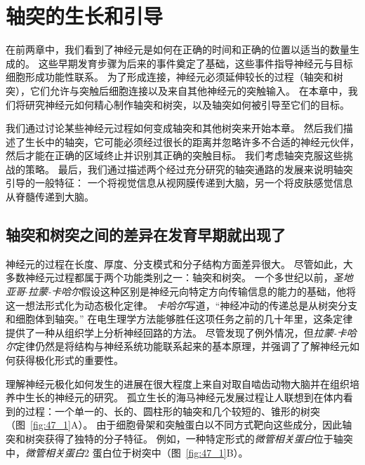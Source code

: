 \chapter{轴突的生长和引导} \label{chap:chap47}


在前两章中，我们看到了神经元是如何在正确的时间和正确的位置以适当的数量生成的。
这些早期发育步骤为后来的事件奠定了基础，这些事件指导神经元与目标细胞形成功能性联系。
为了形成连接，神经元必须延伸较长的过程（轴突和树突），它们允许与突触后细胞连接以及来自其他神经元的突触输入。
在本章中，我们将研究神经元如何精心制作轴突和树突，以及轴突如何被引导至它们的目标。


我们通过讨论某些神经元过程如何变成轴突和其他树突来开始本章。
然后我们描述了生长中的轴突，它可能必须经过很长的距离并忽略许多不合适的神经元伙伴，然后才能在正确的区域终止并识别其正确的突触目标。
我们考虑轴突克服这些挑战的策略。
最后，我们通过描述两个经过充分研究的轴突通路的发展来说明轴突引导的一般特征：
一个将视觉信息从视网膜传递到大脑，另一个将皮肤感觉信息从脊髓传递到大脑。



\section{轴突和树突之间的差异在发育早期就出现了}

神经元的过程在长度、厚度、分支模式和分子结构方面差异很大。
尽管如此，大多数神经元过程都属于两个功能类别之一：轴突和树突。
一个多世纪以前，\textit{圣地亚哥$\cdot$拉蒙-卡哈尔}假设这种区别是神经元向特定方向传输信息的能力的基础，他将这一想法形式化为动态极化定律。
\textit{卡哈尔}写道，“神经冲动的传递总是从树突分支和细胞体到轴突。” 
在电生理学方法能够胜任这项任务之前的几十年里，这条定律提供了一种从组织学上分析神经回路的方法。
尽管发现了例外情况，但\textit{拉蒙-卡哈尔}定律仍然是将结构与神经系统功能联系起来的基本原理，并强调了了解神经元如何获得极化形式的重要性。


理解神经元极化如何发生的进展在很大程度上来自对取自啮齿动物大脑并在组织培养中生长的神经元的研究。
孤立生长的海马神经元发展过程让人联想到在体内看到的过程：一个单一的、长的、圆柱形的轴突和几个较短的、锥形的树突（图~\ref{fig:47_1}A）。
由于细胞骨架和突触蛋白以不同方式靶向这些成分，因此轴突和树突获得了独特的分子特征。
例如，一种特定形式的\textit{微管相关蛋白}位于轴突中，\textit{微管相关蛋白}2 蛋白位于树突中（图~\ref{fig:47_1}B）。


